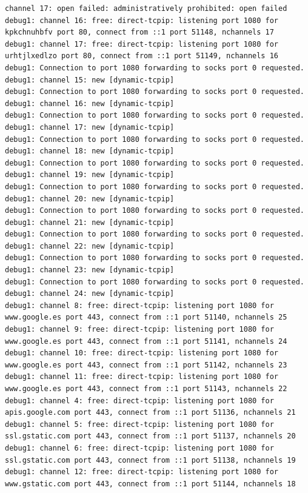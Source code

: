 \documentclass[11pt]{article}
\begin{document}
\begin{lstlisting}
channel 17: open failed: administratively prohibited: open failed
debug1: channel 16: free: direct-tcpip: listening port 1080 for kpkchnuhbfv port 80, connect from ::1 port 51148, nchannels 17
debug1: channel 17: free: direct-tcpip: listening port 1080 for urhtjlxedlzo port 80, connect from ::1 port 51149, nchannels 16
debug1: Connection to port 1080 forwarding to socks port 0 requested.
debug1: channel 15: new [dynamic-tcpip]
debug1: Connection to port 1080 forwarding to socks port 0 requested.
debug1: channel 16: new [dynamic-tcpip]
debug1: Connection to port 1080 forwarding to socks port 0 requested.
debug1: channel 17: new [dynamic-tcpip]
debug1: Connection to port 1080 forwarding to socks port 0 requested.
debug1: channel 18: new [dynamic-tcpip]
debug1: Connection to port 1080 forwarding to socks port 0 requested.
debug1: channel 19: new [dynamic-tcpip]
debug1: Connection to port 1080 forwarding to socks port 0 requested.
debug1: channel 20: new [dynamic-tcpip]
debug1: Connection to port 1080 forwarding to socks port 0 requested.
debug1: channel 21: new [dynamic-tcpip]
debug1: Connection to port 1080 forwarding to socks port 0 requested.
debug1: channel 22: new [dynamic-tcpip]
debug1: Connection to port 1080 forwarding to socks port 0 requested.
debug1: channel 23: new [dynamic-tcpip]
debug1: Connection to port 1080 forwarding to socks port 0 requested.
debug1: channel 24: new [dynamic-tcpip]
debug1: channel 8: free: direct-tcpip: listening port 1080 for www.google.es port 443, connect from ::1 port 51140, nchannels 25
debug1: channel 9: free: direct-tcpip: listening port 1080 for www.google.es port 443, connect from ::1 port 51141, nchannels 24
debug1: channel 10: free: direct-tcpip: listening port 1080 for www.google.es port 443, connect from ::1 port 51142, nchannels 23
debug1: channel 11: free: direct-tcpip: listening port 1080 for www.google.es port 443, connect from ::1 port 51143, nchannels 22
debug1: channel 4: free: direct-tcpip: listening port 1080 for apis.google.com port 443, connect from ::1 port 51136, nchannels 21
debug1: channel 5: free: direct-tcpip: listening port 1080 for ssl.gstatic.com port 443, connect from ::1 port 51137, nchannels 20
debug1: channel 6: free: direct-tcpip: listening port 1080 for ssl.gstatic.com port 443, connect from ::1 port 51138, nchannels 19
debug1: channel 12: free: direct-tcpip: listening port 1080 for www.gstatic.com port 443, connect from ::1 port 51144, nchannels 18
\end{lstlisting}
\end{document}

